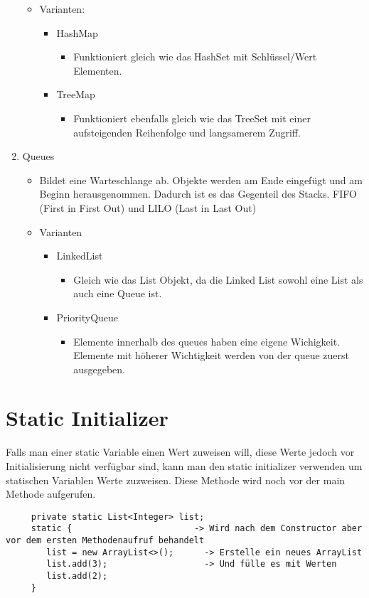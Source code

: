 \documentclass{article}
\begin{document}
\begin{enumerate}
\begin{itemize}
			\item{Varianten:}
			\begin{itemize}
				\item{HashMap}
				\begin{itemize}
					\item{Funktioniert gleich wie das HashSet mit Schlüssel/Wert Elementen.}
				\end{itemize}
				\item{TreeMap}
				\begin{itemize}
					\item{Funktioniert ebenfalls gleich wie das TreeSet mit einer aufsteigenden Reihenfolge und langsamerem Zugriff.}
				\end{itemize}
			\end{itemize}
		\end{itemize}
		\item{Queues}
		\begin{itemize}
			\item{Bildet eine Warteschlange ab. Objekte werden am Ende eingefügt und am Beginn herausgenommen. Dadurch ist es das Gegenteil des Stacks. FIFO (First in First Out) und LILO (Last in Last Out)}
			\item{Varianten}
			\begin{itemize}
				\item{LinkedList}
				\begin{itemize}
					\item{Gleich wie das List Objekt, da die Linked List sowohl eine List als auch eine Queue ist.}
				\end{itemize}
				\item{PriorityQueue}
				\begin{itemize}
					\item{Elemente innerhalb des queues haben eine eigene Wichigkeit. Elemente mit höherer Wichtigkeit werden von der queue zuerst ausgegeben.}
				\end{itemize}
			\end{itemize}
		\end{itemize}
	\end{enumerate}
	 \section{Static Initializer}
	 Falls man einer static Variable einen Wert zuweisen will, diese Werte jedoch vor Initialisierung nicht verfügbar sind, kann man den static initializer verwenden um statischen Variablen Werte zuzweisen. Diese Methode wird noch vor der main Methode aufgerufen. \\
	 \begin{verbatim}
	 private static List<Integer> list;
	 static {                        -> Wird nach dem Constructor aber vor dem ersten Methodenaufruf behandelt
	 	list = new ArrayList<>();      -> Erstelle ein neues ArrayList
	 	list.add(3);                   -> Und fülle es mit Werten
	 	list.add(2);
	 }
	 \end{verbatim}
\end{document}
